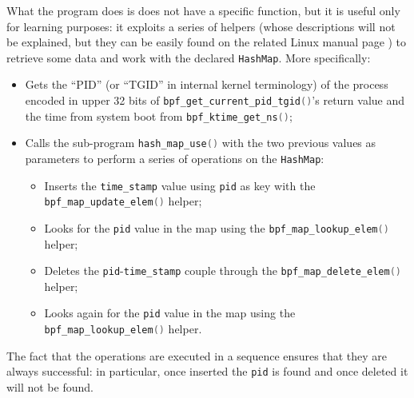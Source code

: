 What the program does is does not have a specific function, but it is useful only for learning purposes: it exploits a series of helpers (whose descriptions will not be explained, but they can be easily found on the related Linux manual page \cite{LinuxHelpers}) to retrieve some data and work with the declared \colorbox{backcolour}{\lstinline[style=highlight, language=bash]|HashMap|}.
More specifically:

\begin{itemize}
	\item 
		Gets the ``PID'' (or ``TGID'' in internal kernel terminology) of the process encoded in upper 32 bits of \colorbox{backcolour}{\lstinline[style=cstyle, language=C]|bpf_get_current_pid_tgid()|}'s return value and the time from system boot from \colorbox{backcolour}{\lstinline[style=cstyle, language=C]|bpf_ktime_get_ns()|};
	\item 
		Calls the sub-program \colorbox{backcolour}{\lstinline[style=cstyle, language=C]|hash_map_use()|} with the two previous values as parameters to perform a series of operations on the \colorbox{backcolour}{\lstinline[style=highlight, language=bash]|HashMap|}:
		\begin{itemize}
			\item 
				Inserts the \colorbox{backcolour}{\lstinline[style=cstyle, language=C]|time_stamp|} value using \colorbox{backcolour}{\lstinline[style=cstyle, language=C]|pid|} as key with the \colorbox{backcolour}{\lstinline[style=cstyle, language=C]|bpf_map_update_elem()|} helper;
			\item 
				Looks for the \colorbox{backcolour}{\lstinline[style=cstyle, language=C]|pid|} value in the map using the \colorbox{backcolour}{\lstinline[style=cstyle, language=C]|bpf_map_lookup_elem()|} helper;
			\item 
				Deletes the \colorbox{backcolour}{\lstinline[style=cstyle, language=C]|pid|}-\colorbox{backcolour}{\lstinline[style=cstyle, language=C]|time_stamp|} couple through the \colorbox{backcolour}{\lstinline[style=cstyle, language=C]|bpf_map_delete_elem()|} helper;
			\item 
				Looks again for the \colorbox{backcolour}{\lstinline[style=cstyle, language=C]|pid|} value in the map using the \colorbox{backcolour}{\lstinline[style=cstyle, language=C]|bpf_map_lookup_elem()|} helper.
		\end{itemize}
\end{itemize}

The fact that the operations are executed in a sequence ensures that they are always successful: in particular, once inserted the \colorbox{backcolour}{\lstinline[style=cstyle, language=C]|pid|} is found and once deleted it will not be found.

